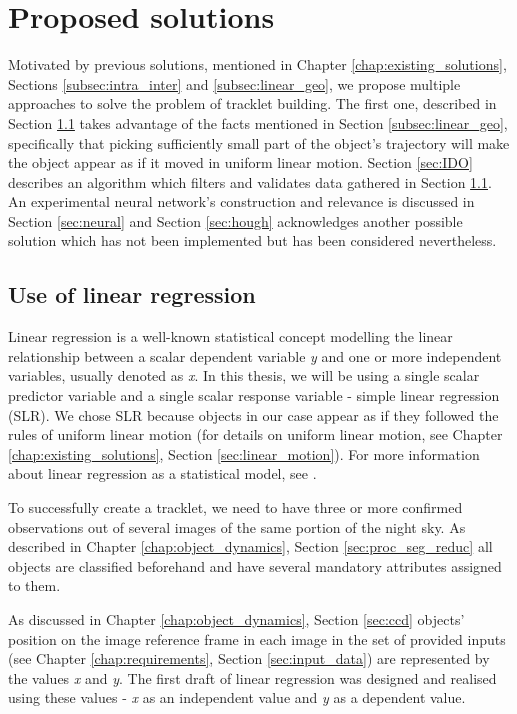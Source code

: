 \chapter{Proposed solutions}\label{chap:proposed_solutions}

	Motivated by previous solutions, mentioned in Chapter \ref{chap:existing_solutions}, Sections \ref{subsec:intra_inter} and \ref{subsec:linear_geo}, we propose multiple approaches to solve the problem of tracklet building. The first one, described in Section \ref{sec:linear_regression} takes advantage of the facts mentioned in Section \ref{subsec:linear_geo}, specifically that picking sufficiently small part of the object's trajectory will make the object appear as if it moved in uniform linear motion. Section \ref{sec:IDO} describes an algorithm which filters and validates data gathered in Section \ref{sec:linear_regression}. An experimental neural network's construction and relevance is discussed in Section \ref{sec:neural} and Section \ref{sec:hough} acknowledges another possible solution which has not been implemented but has been considered nevertheless.

\section{Use of linear regression}\label{sec:linear_regression}

	Linear regression is a well-known statistical concept modelling the linear relationship between a scalar dependent variable \emph{y} and one or more independent variables, usually denoted as \emph{x}. In this thesis, we will be using a single scalar predictor variable and a single scalar response variable - simple linear regression (SLR). We chose SLR because objects in our case appear as if they followed the rules of uniform linear motion (for details on uniform linear motion, see Chapter \ref{chap:existing_solutions}, Section \ref{sec:linear_motion}). For more information about linear regression as a statistical model, see \citep{freedman2005statistical}.
	
	To successfully create a tracklet, we need to have three or more confirmed observations out of several images of the same portion of the night sky. As described in Chapter \ref{chap:object_dynamics}, Section \ref{sec:proc_seg_reduc} all objects are classified beforehand and have several mandatory attributes assigned to them.
	
	As discussed in Chapter \ref{chap:object_dynamics}, Section \ref{sec:ccd} objects' position on the image reference frame in each image in the set of provided inputs (see Chapter \ref{chap:requirements}, Section \ref{sec:input_data}) are represented by the values \emph{x} and \emph{y}. The first draft of linear regression was designed and realised using these values - \emph{x} as an independent value and \emph{y} as a dependent value.
	
